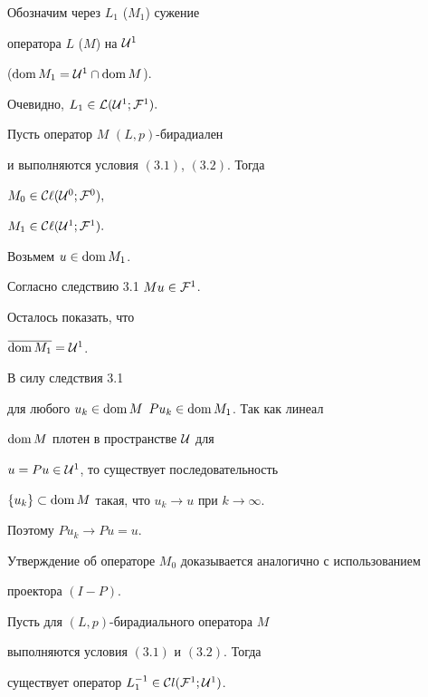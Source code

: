 Обозначим через $L_1$ ($M_1$) сужение


оператора $L$ ($M$) на ${\cal U}^1$


($\operatorname{dom} M_1={\cal U}^1 \cap \operatorname{dom} M$).


Очевидно, $L_1\in {\cal L }({\cal U}^1;{\cal F}^1).$








\begin{lems}


Пусть оператор $M$\; $(L,p)$-бирадиален


и выполняются условия $(3.1)$, $(3.2)$. Тогда


$M_0\in {\cal C \ell }({\cal U}^0;{\cal F}^0),$


$M_1\in {\cal C \ell} ({\cal U}^1;{\cal F}^1).$


\end{lems}





\begin{pf}


Возьмем $u\in \operatorname{dom} M_1$.


Согласно следствию 3.1\; $Mu\in {\cal F}^1$.


Осталось показать, что


$\overline{\operatorname{dom} M_1}={\cal U}^1$.


В силу следствия 3.1


для любого $u_k\in\operatorname{dom} M$\; $Pu_k\in\operatorname{dom} M_1$. Так как линеал


$\operatorname{dom} M$ плотен в пространстве ${\cal U}$ для


$u=Pu\in {\cal U}^1$, то существует последовательность


$\{ u_k\}\subset\operatorname{dom} M$ такая, что $u_k\to u$ при $k\to\infty$.


Поэтому $Pu_k\to Pu=u$.





Утверждение об операторе $M_0$ доказывается аналогично с использованием


проектора $(I-P)$.


\end{pf}








\begin{lems}


Пусть для $(L,p)$-бирадиального оператора $M$


выполняются условия $(3.1)$ и $(3.2)$. Тогда


существует оператор $L_1^{-1}\in {\cal C}l({\cal F}^1;{\cal U}^1)$.


\end{lems}





